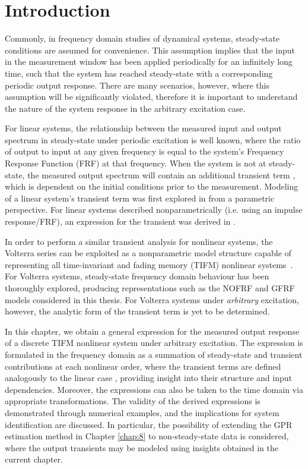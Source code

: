 \section{Introduction}

Commonly, in frequency domain studies of dynamical systems, steady-state conditions are assumed for convenience. This assumption implies that the input in the measurement window has been applied periodically for an infinitely long time, such that the system has reached steady-state with a corresponding periodic output response. There are many scenarios, however, where this assumption will be significantly violated, therefore it is important to understand the nature of the system response in the arbitrary excitation case.

For linear systems, the relationship between the measured input and output spectrum in steady-state under periodic excitation is well known, where the ratio of output to input at any given frequency is equal to the system's Frequency Response Function (FRF) at that frequency. When the system is not at steady-state, the measured output spectrum will contain an additional transient term \cite{Pintelon2012}, which is dependent on the initial conditions prior to the measurement. Modeling of a linear system's transient term was first explored in \cite{Pintelon1997} from a parametric perspective. For linear systems described nonparametrically (i.e. using an impulse response/FRF), an expression for the transient was derived in \cite{Lataire2016}. 

In order to perform a similar transient analysis for nonlinear systems, the Volterra series can be exploited as a nonparametric model structure capable of representing all time-invariant and fading memory (TIFM) nonlinear systems~\cite{Boyd1985}. For Volterra systems, steady-state frequency domain behaviour has been thoroughly explored, producing representations such as the NOFRF and GFRF models considered in this thesis. For Volterra systems under \emph{arbitrary} excitation, however, the analytic form of the transient term is yet to be determined.

In this chapter, we obtain a general expression for the measured output response of a discrete TIFM nonlinear system under arbitrary excitation. The expression is formulated in the frequency domain as a summation of steady-state and transient contributions at each nonlinear order, where the transient terms are defined analogously to the linear case \cite{Lataire2016}, providing insight into their structure and input dependencies. Moreover, the expressions can also be taken to the time domain via appropriate transformations. The validity of the derived expressions is demonstrated through numerical examples, and the implications for system identification are discussed. In particular, the possibility of extending the GPR estimation method in Chapter \ref{chap:8} to non-steady-state data is considered, where the output transients may be modeled using insights obtained in the current chapter.


